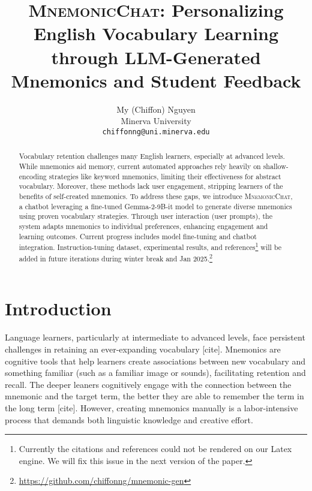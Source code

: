 \documentclass[11pt, onecolumn]{article}
\title{\textsc{MnemonicChat}: Personalizing English Vocabulary Learning through LLM-Generated Mnemonics and Student Feedback}
\author{My (Chiffon) Nguyen \\
  Minerva University \\
  \texttt{chiffonng@uni.minerva.edu}}
\begin{document}
\maketitle
\begin{abstract}
Vocabulary retention challenges many English learners, especially at advanced levels. While mnemonics aid memory, current automated approaches rely heavily on shallow-encoding strategies like keyword mnemonics, limiting their effectiveness for abstract vocabulary. Moreover, these methods lack user engagement, stripping learners of the benefits of self-created mnemonics. To address these gaps, we introduce \textsc{MnemonicChat}, a chatbot leveraging a fine-tuned Gemma-2-9B-it model to generate diverse mnemonics using proven vocabulary strategies. Through user interaction (user prompts), the system adapts mnemonics to individual preferences, enhancing engagement and learning outcomes. Current progress includes model fine-tuning and chatbot integration. Instruction-tuning dataset, experimental results, and references\footnote{Currently the citations and references could not be rendered on our Latex engine. We will fix this issue in the next version of the paper.} will be added in future iterations during winter break and Jan 2025.\footnote{\href{https://github.com/chiffonng/mnemonic-gen}{https://github.com/chiffonng/mnemonic-gen}}
\end{abstract}

\section{Introduction} \label{sec:intro}
Language learners, particularly at intermediate to advanced levels, face persistent challenges in retaining an ever-expanding vocabulary [cite]. Mnemonics are cognitive tools that help learners create associations between new vocabulary and something familiar (such as a familiar image or sounds), facilitating retention and recall. The deeper leaners cognitively engage with the connection between the mnemonic and the target term, the better they are able to remember the term in the long term [cite]. However, creating mnemonics manually is a labor-intensive process that demands both linguistic knowledge and creative effort.
\end{document}
